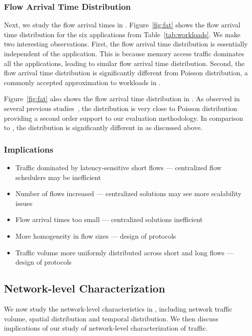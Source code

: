 \subsubsection{Flow Arrival Time Distribution}
\label{ssec:fatd}
Next, we study the flow arrival times in \dis. Figure~\ref{fig:fat} shows the flow arrival time distribution for the six applications from Table~\ref{tab:workloads}. We make two interesting observations. First, the flow arrival time distribution is essentially independent of the application. This is because memory access traffic dominates all the applications, leading to similar flow arrival time distribution. Second, the flow arrival time distribution is significantly different from Poisson distribution, a commonly accepted approximation to workloads in \pdis. 

Figure~\ref{fig:fat} also shows the flow arrival time distribution in \pdis. As observed in several previous studies~\cite{imc-srikanth, imc-theo}, the distribution is very close to Poisson distribution providing a second order support to our evaluation methodology. In comparison to \pdis, the distribution is significantly different in \dis as discussed above.

\subsubsection{Implications}
\begin{itemize}[leftmargin=*]
	\itemsep0em
	\item Traffic dominated by latency-sensitive short flows --- centralized flow schedulers may be inefficient
	\item Number of flows increased --- centralized solutions may see more scalability issues
	\item {} Flow arrival times too small --- centralized solutions inefficient
	\item More homogeneity in flow sizes --- design of protocols
	\item Traffic volume more uniformly distributed across short and long flows --- design of protocols
\end{itemize}

\subsection{Network-level Characterization} 
\label{ssec:nlc}
We now study the network-level characteristics in \dis, including network traffic volume, spatial distribution and temporal distribution. We then discuss implications of our study of network-level characterization of \dis traffic.

